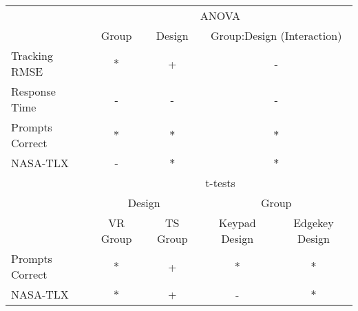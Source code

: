 \begin{tabular}{@{}lcccc@{}}
\toprule
                & \multicolumn{4}{c}{ANOVA} \\
                & Group & Design & \multicolumn{2}{c}{Group:Design (Interaction)}\\
\midrule
Tracking RMSE   & $*$ &  +  & \multicolumn{2}{c}{ - } \\
Response Time   &  -  &  -  & \multicolumn{2}{c}{ - } \\
Prompts Correct & $*$ & $*$ & \multicolumn{2}{c}{$*$} \\
NASA-TLX        &  -  & $*$ & \multicolumn{2}{c}{$*$} \\
\midrule
                & \multicolumn{4}{c}{t-tests} \\
                & \multicolumn{2}{c}{Design} & \multicolumn{2}{c}{Group} \\
                & VR Group & TS Group  & Keypad Design & Edgekey Design \\
\midrule
Prompts Correct & $*$ & + & $*$ & $*$ \\
NASA-TLX        & $*$ & + &  -  & $*$ \\
\bottomrule
\end{tabular}
